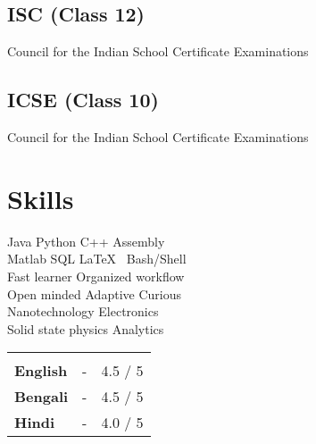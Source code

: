 \documentclass[]{psyqe-resume-openfont}
\begin{document}
\begin{minipage}[t]{0.34\textwidth}
\subsection{ISC (Class 12)}
Council for the Indian School Certificate Examinations \\
\vspace{4pt}
\sectionsep

\subsection{ICSE (Class 10)}
Council for the Indian School Certificate Examinations \\
\sectionsep


\section{Skills}
\vspace{1pt}
\textbullet{} Java \textbullet{} Python \textbullet{} C++ \textbullet{}
Assembly \textbullet{} \\
\textbullet{} Matlab \textbullet{} SQL \textbullet{} \LaTeX\ \textbullet{} Bash/Shell \textbullet{} \\
\vspace{4pt}
\vspace{1pt}
\textbullet{} Fast learner \textbullet{} Organized workflow \textbullet{} \\
\textbullet{} Open minded \textbullet{} Adaptive \textbullet{} Curious \textbullet{} \\
\vspace{4pt}
\vspace{1pt}
\textbullet{} Nanotechnology \textbullet{} Electronics \textbullet{} \\
\textbullet{} Solid state physics \textbullet{} Analytics \textbullet{} \\
\vspace{4pt}
\begin{tabular}{llc}
\vspace{-8pt} \\
\textbullet{} \textbf{English} & - & 4.5 / 5 \\
\textbullet{} \textbf{Bengali} & - & 4.5 / 5 \\
\textbullet{} \textbf{Hindi} & - & 4.0 / 5 \\
\end{tabular}
\sectionsep

%
%

\end{minipage} 
\end{document}
